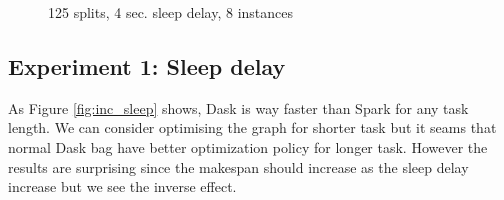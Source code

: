 \documentclass[11pt,a4paper]{article}
\begin{document}
\begin{figure}[p]
    \centering
    
    \caption{125 splits, 4 sec. sleep delay, 8 instances}
    \label{fig:inc_itr}
\end{figure}


\subsection{Experiment 1: Sleep delay}
As Figure \ref{fig:inc_sleep} shows, Dask is way faster than Spark for any task length. We can consider optimising the graph for shorter task but it seams that normal Dask bag have better optimization policy for longer task. However the results are surprising since the makespan should increase as the sleep delay increase but we see the inverse effect.
\end{document}
